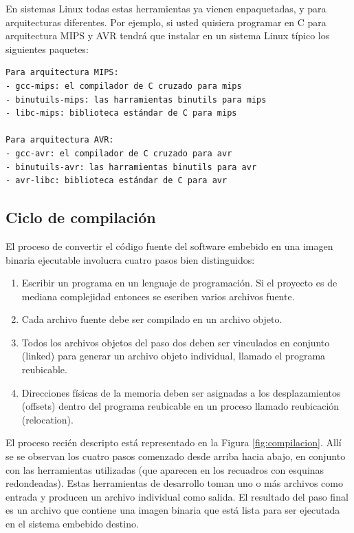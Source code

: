 \documentclass[output=paper, 
colorlinks,
citecolor=brown,
newtxmath
]{langscibook}
\begin{document}
En sistemas Linux todas estas herramientas ya vienen enpaquetadas,
y para arquitecturas diferentes. Por ejemplo, si usted quisiera programar
en C para arquitectura MIPS y AVR tendrá que instalar en un sistema Linux
típico los siguientes paquetes: 

\begin{verbatim}
Para arquitectura MIPS:
- gcc-mips: el compilador de C cruzado para mips
- binutuils-mips: las harramientas binutils para mips
- libc-mips: biblioteca estándar de C para mips

Para arquitectura AVR:
- gcc-avr: el compilador de C cruzado para avr
- binutuils-avr: las harramientas binutils para avr
- avr-libc: biblioteca estándar de C para avr
\end{verbatim}

\subsection{Ciclo de compilación}

El proceso de convertir el código fuente del software embebido
en una imagen binaria ejecutable involucra cuatro pasos bien distinguidos:

\begin{enumerate}
\item Escribir un programa en un lenguaje de programación. Si el proyecto
es de mediana complejidad entonces se escriben varios archivos fuente.
\item Cada archivo fuente debe ser compilado en un archivo objeto.
\item Todos los archivos objetos del paso dos deben ser vinculados en conjunto
(linked) para generar un archivo objeto individual, llamado el programa reubicable.
\item Direcciones físicas de la memoria deben ser asignadas a los desplazamientos (offsets)
dentro del programa reubicable en un proceso llamado reubicación (relocation).
\end{enumerate}


El proceso recién descripto está representado en la Figura \ref{fig:compilacion}.
Allí se se observan los cuatro pasos comenzado desde arriba hacia abajo,
en conjunto con las herramientas utilizadas (que aparecen
en los recuadros con esquinas redondeadas).
Estas herramientas de desarrollo toman uno o más archivos como entrada
y producen un archivo individual como salida. 
El resultado del paso final es un archivo que contiene una imagen binaria
que está lista para ser ejecutada en el sistema embebido destino.
\end{document}
